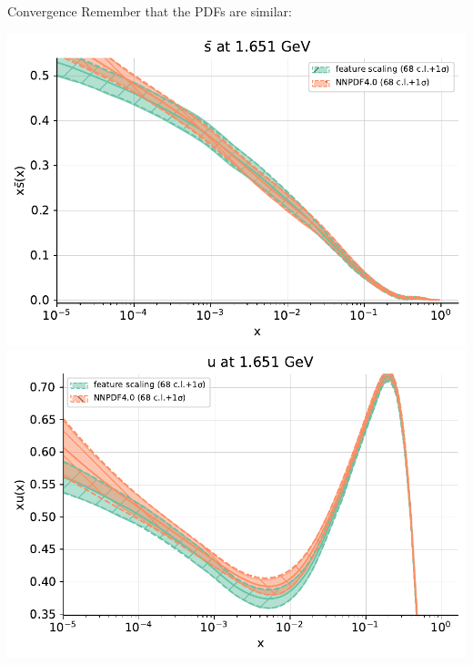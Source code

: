 \documentclass[aspectratio=169,11pt]{beamer}
\begin{document}
\begin{frame}[t]{Convergence}
  Remember that the PDFs are similar:\\
  \begin{center}
    \includegraphics[height=0.5\textheight]{figures/pdf_sbar_log_feature_vs_nnpdf40.pdf}
    \includegraphics[height=0.5\textheight]{figures/pdf_u_log_feature_vs_nnpdf40.pdf}
  \end{center}
\end{frame}
\end{document}
